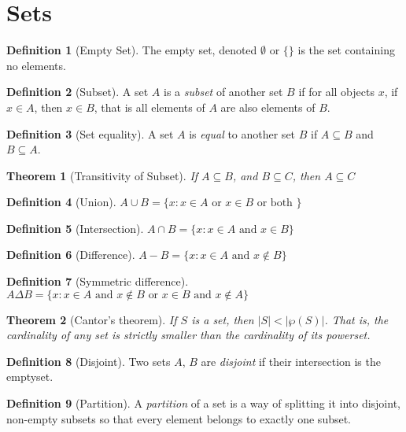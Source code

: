 \documentclass[12pt]{article}
\newtheorem{theorem}{Theorem}[section]
\theoremstyle{definition}
\newtheorem{definition}{Definition}[section]
\begin{document}
\section{Sets}
\begin{definition}[Empty Set]
    The empty set, denoted $\emptyset$ or $\{\}$ is the set containing no elements.
\end{definition}
\begin{definition}[Subset]
    A set $A$ is a \emph{subset} of another set $B$ if for all objects $x$, if $x \in A$, then $x \in B$, that is all elements of $A$ are also elements of $B$.
\end{definition}
\begin{definition}[Set equality]
    A set $A$ is \emph{equal} to another set $B$ if $A \subseteq B$ and $B \subseteq A$.
\end{definition}
\begin{theorem}[Transitivity of Subset]
    If $A \subseteq B$, and $B \subseteq C$, then $A \subseteq C$
\end{theorem}
\begin{definition}[Union]
    $A \cup B = \{x : x \in A \text{ or } x \in B \text{ or both }\}$
\end{definition}
\begin{definition}[Intersection]
    $A \cap B = \{x : x \in A \text{ and } x \in B\}$
\end{definition}
\begin{definition}[Difference]
    $A - B = \{x : x \in A \text{ and } x \notin B\}$
\end{definition}
\begin{definition}[Symmetric difference]
    $A \Delta B = \{x : x \in A \text{ and } x \notin B \text{ or } x \in B \text{ and } x \notin A\}$
\end{definition}
\begin{theorem}[Cantor's theorem]
    If $S$ is a set, then $|S| < |\wp(S)|$. That is, the cardinality of any set is strictly smaller than the cardinality of its powerset.
\end{theorem}
\begin{definition}[Disjoint]
    Two sets $A$, $B$ are \emph{disjoint} if their intersection is the emptyset.
\end{definition}
\begin{definition}[Partition]
    A \emph{partition} of a set is a way of splitting it into disjoint, non-empty subsets so that every element belongs to exactly one subset.
\end{definition}
\end{document}
